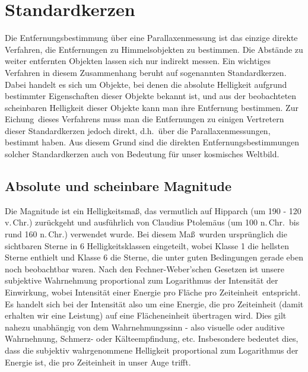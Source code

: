 \section{Standardkerzen}

Die Entfernungsbestimmung \"uber eine Parallaxenmessung ist das einzige direkte Verfahren, die
Entfernungen zu Himmelsobjekten zu bestimmen. Die Abst\"ande zu weiter entfernten Objekten
lassen sich nur indirekt messen. Ein wichtiges Verfahren in diesem Zusammenhang beruht auf sogenannten
Standardkerzen. 
Dabei handelt es sich um Objekte, bei denen die absolute Helligkeit aufgrund
bestimmter Eigenschaften dieser Objekte bekannt ist, und aus der beobachteten scheinbaren Helligkeit
dieser Objekte kann man ihre Entfernung bestimmen. 
Zur \glqq Eichung\grqq\ dieses Verfahrens muss man die Entfernungen zu einigen Vertretern dieser
Standardkerzen jedoch direkt, d.h.\ \"uber die Parallaxenmessungen, bestimmt haben. Aus diesem
Grund sind die direkten Entfernungsbestimmungen solcher Standardkerzen auch von Bedeutung f\"ur 
unser kosmisches Weltbild. 

\subsection{Absolute und scheinbare Magnitude}

Die Magnitude 
ist ein Helligkeitsma\ss, das vermutlich auf 
Hipparch (um 190 - 120 v.\,Chr.) 
zur\"uckgeht und ausf\"uhrlich von Claudius Ptolem\"aus (um 100 n.\,Chr.\ bis rund 160 n.\,Chr.)
verwendet wurde. Bei diesem Ma\ss\ wurden urspr\"unglich
die sichtbaren Sterne in 6 Helligkeitsklassen eingeteilt, wobei Klasse 1 die hellsten Sterne
enthielt und Klasse 6 die Sterne, die unter guten Bedingungen gerade eben noch beobachtbar waren. 
Nach den Fechner-Weber'schen Gesetzen 
ist unsere subjektive Wahrnehmung 
proportional zum Logarithmus der Intensit\"at der Einwirkung, wobei Intensit\"at einer \glqq Energie pro Fl\"ache pro
Zeiteinheit\grqq\ entspricht. Es handelt sich bei der Intensit\"at also um eine Energie, die pro Zeiteinheit
(damit erhalten wir eine Leistung) auf eine Fl\"acheneinheit \"ubertragen wird. Dies gilt nahezu unabh\"angig von dem
Wahrnehmungssinn - also visuelle oder auditive Wahrnehnung, Schmerz- oder K\"alteempfindung, etc. 
Insbesondere bedeutet dies,
dass die subjektiv wahrgenommene Helligkeit proportional zum Logarithmus der Energie ist, die pro Zeiteinheit 
in unser Auge trifft. 

